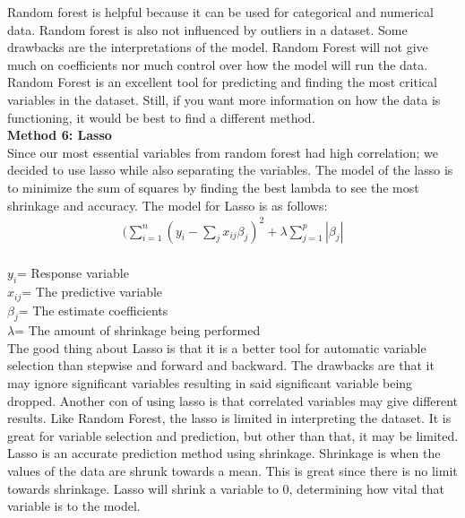 \documentclass[11pt,letterpaper]{amsart}
\begin{document}
\cite{8} \newline
\indent Random forest is helpful because it can be used for categorical and numerical data. Random forest is also not influenced by outliers in a dataset. Some drawbacks are the interpretations of the model. Random Forest will not give much on coefficients nor much control over how the model will run the data. Random Forest is an excellent tool for predicting and finding the most critical variables in the dataset. Still, if you want more information on how the data is functioning, it would be best to find a different method.\\

\noindent \large \textbf{Method 6: Lasso}\\
\indent Since our most essential variables from random forest had high correlation; we decided to use lasso while also separating the variables. The model of the lasso is to minimize the sum of squares by finding the best lambda to see the most shrinkage and accuracy. The model for Lasso is as follows: 
\begin{align*}
(\sum ^n_{i=1}(y_i - \sum_{j}x_{ij}\beta_j)^2 + \lambda \sum^p_{j=1} |\beta_j|
\end{align*}\\
\textbf{$y_i$}= Response variable\\
\textbf{$x_{ij}$}= The predictive variable\\
\textbf{$\beta_j$}= The estimate coefficients\\
\textbf{$\lambda$}= The amount of shrinkage being performed\\
\cite{9} \leavevmode \newline
\indent The good thing about Lasso is that it is a better tool for automatic variable selection than stepwise and forward and backward. The drawbacks are that it may ignore significant variables resulting in said significant variable being dropped. Another con of using lasso is that correlated variables may give different results. Like Random Forest, the lasso is limited in interpreting the dataset. It is great for variable selection and prediction, but other than that, it may be limited.\\
\indent Lasso is an accurate prediction method using shrinkage. Shrinkage is when the values of the data are shrunk towards a mean. This is great since there is no limit towards shrinkage. Lasso will shrink a variable to 0, determining how vital that variable is to the model.\\\\
\end{document}
